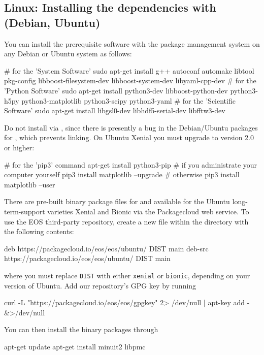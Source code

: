 \subsection{Linux: Installing the dependencies with  (Debian, Ubuntu)}

You can install the prerequisite software with the  package
management system on any Debian or Ubuntu system as follows:
\begin{commandline}
# for the 'System Software'
sudo apt-get install g++ autoconf automake libtool pkg-config libboost-filesystem-dev libboost-system-dev libyaml-cpp-dev
# for the 'Python Software'
sudo apt-get install python3-dev libboost-python-dev python3-h5py python3-matplotlib python3-scipy python3-yaml
# for the 'Scientific Software'
sudo apt-get install libgsl0-dev libhdf5-serial-dev libfftw3-dev
\end{commandline}
Do not install  via , since there is presently a
bug in the Debian/Ubuntu packages for , which prevents
linking. On Ubuntu Xenial you must upgrade  to version 2.0 or higher:
\begin{commandline}
# for the 'pip3' command
apt-get install python3-pip
# if you administrate your computer yourself
pip3 install matplotlib --upgrade
# otherwise
pip3 install matplotlib --user
\end{commandline}


There are pre-built binary package files for
 and  available for the Ubuntu
long-term-support varieties Xenial and Bionic via the Packagecloud web service.
To use the EOS third-party repository, create a new file  within
the directory  with the following contents:
\begin{file}
deb https://packagecloud.io/eos/eos/ubuntu/ DIST main
deb-src https://packagecloud.io/eos/eos/ubuntu/ DIST main
\end{file}
where you must replace \texttt{DIST} with either \texttt{xenial} or
\texttt{bionic}, depending on your version of Ubuntu. Add our repository's
GPG key by running
\begin{commandline}
curl -L "https://packagecloud.io/eos/eos/gpgkey" 2> /dev/null | apt-key add - &>/dev/null
\end{commandline}
You can then install the binary packages through
\begin{commandline}
apt-get update
apt-get install minuit2 libpmc
\end{commandline}

